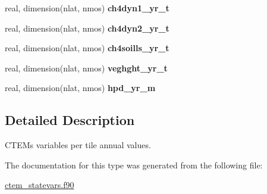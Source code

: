 \begin{DoxyCompactItemize}
\item 
\hypertarget{structctem__statevars_1_1ctem__tileavg__annual_a16a3d0604144a08410f1e1d16449e548}{}real, dimension(nlat, nmos) {\bfseries ch4dyn1\+\_\+yr\+\_\+t}\label{structctem__statevars_1_1ctem__tileavg__annual_a16a3d0604144a08410f1e1d16449e548}

\item 
\hypertarget{structctem__statevars_1_1ctem__tileavg__annual_ae1705c34b1db3514449a1b3b0f6ad0b2}{}real, dimension(nlat, nmos) {\bfseries ch4dyn2\+\_\+yr\+\_\+t}\label{structctem__statevars_1_1ctem__tileavg__annual_ae1705c34b1db3514449a1b3b0f6ad0b2}

\item 
\hypertarget{structctem__statevars_1_1ctem__tileavg__annual_ab67d092e8b427e22886fa04fc552cfde}{}real, dimension(nlat, nmos) {\bfseries ch4soills\+\_\+yr\+\_\+t}\label{structctem__statevars_1_1ctem__tileavg__annual_ab67d092e8b427e22886fa04fc552cfde}

\item 
\hypertarget{structctem__statevars_1_1ctem__tileavg__annual_ae2944baabbe643406d14e8b72ea34708}{}real, dimension(nlat, nmos) {\bfseries veghght\+\_\+yr\+\_\+t}\label{structctem__statevars_1_1ctem__tileavg__annual_ae2944baabbe643406d14e8b72ea34708}

\item 
\hypertarget{structctem__statevars_1_1ctem__tileavg__annual_a30471ca16969105f273d94df7d65f0a2}{}real, dimension(nlat, nmos) {\bfseries hpd\+\_\+yr\+\_\+m}\label{structctem__statevars_1_1ctem__tileavg__annual_a30471ca16969105f273d94df7d65f0a2}

\end{DoxyCompactItemize}


\subsection{Detailed Description}
C\+T\+E\+M\textquotesingle{}s variables per tile annual values. 

The documentation for this type was generated from the following file\+:\begin{DoxyCompactItemize}
\item 
\hyperlink{ctem__statevars_8f90}{ctem\+\_\+statevars.\+f90}\end{DoxyCompactItemize}
